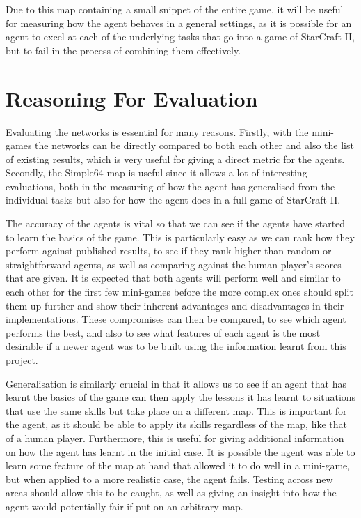 Due to this map containing a small snippet of the entire game, it will be useful
for measuring how the agent behaves in a general settings, as it is possible for
an agent to excel at each of the underlying tasks that go into a game of
StarCraft II, but to fail in the process of combining them effectively.

\section{Reasoning For Evaluation}

Evaluating the networks is essential for many reasons. Firstly, with the
mini-games the networks can be directly compared to both each other and also the
list of existing results, which is very useful for giving a direct metric for
the agents. Secondly, the Simple64 map is useful since it allows a lot of
interesting evaluations, both in the measuring of how the agent has generalised
from the individual tasks but also for how the agent does in a full game of
StarCraft II\@.

The accuracy of the agents is vital so that we can see if the agents have
started to learn the basics of the game. This is particularly easy as we can
rank how they perform against published results, to see if they rank higher than
random or straightforward agents, as well as comparing against the human
player's scores that are given. It is expected that both agents will perform
well and similar to each other for the first few mini-games before the more
complex ones should split them up further and show their inherent advantages and
disadvantages in their implementations. These compromises can then be compared,
to see which agent performs the best, and also to see what features of each
agent is the most desirable if a newer agent was to be built using the
information learnt from this project.

Generalisation is similarly crucial in that it allows us to see if an agent that
has learnt the basics of the game can then apply the lessons it has learnt to
situations that use the same skills but take place on a different map. This is
important for the agent, as it should be able to apply its skills regardless of
the map, like that of a human player. Furthermore, this is useful for giving
additional information on how the agent has learnt in the initial case. It is
possible the agent was able to learn some feature of the map at hand that
allowed it to do well in a mini-game, but when applied to a more realistic case,
the agent fails. Testing across new areas should allow this to be caught, as
well as giving an insight into how the agent would potentially fair if put on an
arbitrary map.

